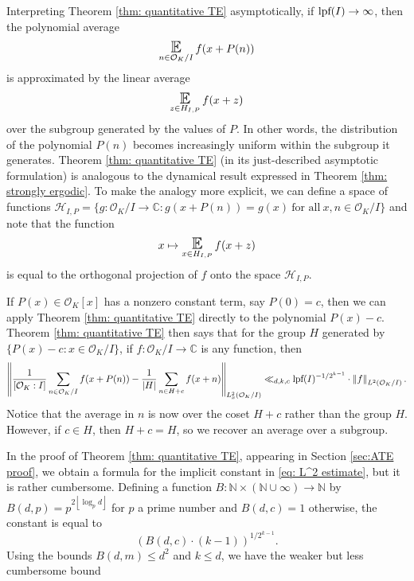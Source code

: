\documentclass{amsart}
\theoremstyle{definition}
\numberwithin{equation}{section}
\newcommand{\N}{\mathbb{N}}
\newcommand{\C}{\mathbb{C}}
\newcommand{\mO}{\mathcal{O}}
\newcommand{\lpf}{\normalfont\text{lpf}}
\newcommand{\floor}[1]{\left\lfloor #1 \right\rfloor}
\DeclareMathOperator*{\E}{\text{\Large $\mathbb{E}$}}
\newcommand{\norm}[2]{\left\| #2 \right\|_{#1}}
\begin{document}
Interpreting Theorem \ref{thm: quantitative TE} asymptotically, if $\lpf(I) \to \infty$, then the polynomial average
\begin{equation*}
    \E_{n \in \mO_K/I} f(x + P(n))
\end{equation*}
is approximated by the linear average
\begin{equation*}
    \E_{z \in H_{I,P}} f(x + z)
\end{equation*}
over the subgroup generated by the values of $P$.
In other words, the distribution of the polynomial $P(n)$ becomes increasingly uniform within the subgroup it generates.
Theorem \ref{thm: quantitative TE} (in its just-described asymptotic formulation) is analogous to the dynamical result expressed in Theorem \ref{thm: strongly ergodic}.
To make the analogy more explicit, we can define a space of functions $\mathcal{H}_{I,P} = \{g : \mO_K/I \to \C : g(x+P(n)) = g(x)~\text{for all}~x, n \in \mO_K/I\}$ and note that the function
\begin{equation*}
    x \mapsto \E_{x \in H_{I,P}} f(x+z)
\end{equation*}
is equal to the orthogonal projection of $f$ onto the space $\mathcal{H}_{I,P}$.

If $P(x) \in \mO_K[x]$ has a nonzero constant term, say $P(0) = c$, then we can apply Theorem \ref{thm: quantitative TE} directly to the polynomial $P(x) - c$.
Theorem \ref{thm: quantitative TE} then says that for the group $H$ generated by $\{P(x) - c: x \in \mO_K/I\}$, if $f : \mO_K/I \to \C$ is any function, then
\begin{equation*}
		\norm{L^2_x(\mO_K/I)}{\frac{1}{[\mO_K:I]}\sum_{n \in \mO_K/I} f(x+P(n)) - \frac{1}{|H|} \sum_{n \in H+c} f(x+n)} \ll_{d,k,c} \lpf(I)^{-1/2^{k-1}} \cdot \norm{L^2(\mO_K/I)}{f}.
\end{equation*}
Notice that the average in $n$ is now over the coset $H + c$ rather than the group $H$.
However, if $c \in H$, then $H + c = H$, so we recover an average over a subgroup.

In the proof of Theorem \ref{thm: quantitative TE}, appearing in Section \ref{sec:ATE proof}, we obtain a formula for the implicit constant in \eqref{eq: L^2 estimate}, but it is rather cumbersome.
Defining a function $B : \N \times (\N \cup \infty) \to \N$ by $B(d,p) = p^{2\floor{\log_p{d}}}$ for $p$ a prime number and $B(d,c) = 1$ otherwise, the constant is equal to
\begin{equation*}
    \left( B(d,c) \cdot (k-1) \right)^{1/2^{k-1}}.
\end{equation*}
Using the bounds $B(d,m) \le d^2$ and $k \le d$, we have the weaker but less cumbersome bound
\end{document}
